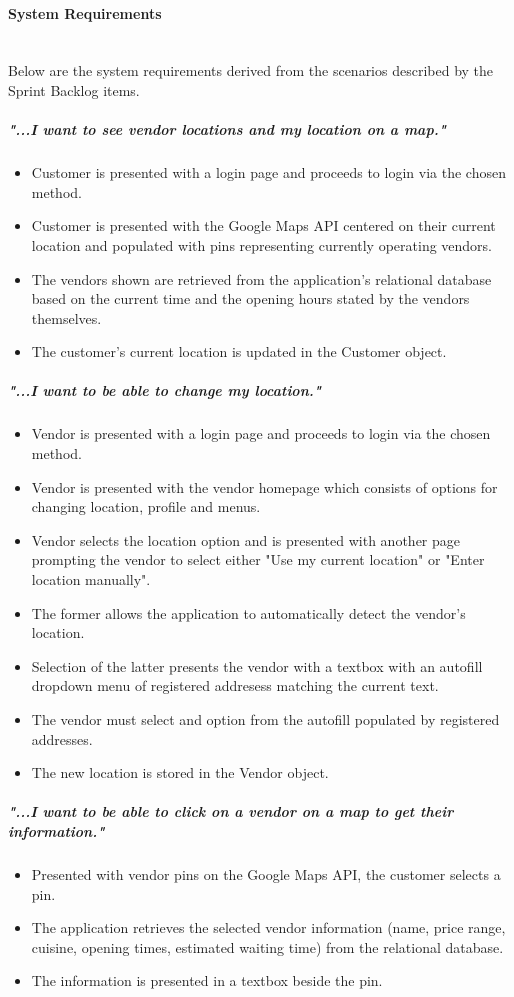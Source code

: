 \paragraph{System Requirements}\mbox{} \\
Below are the system requirements derived from the scenarios described by the Sprint Backlog items.
\subparagraph{"...I want to see vendor locations and my location on a map."}
\begin{itemize}
  \item Customer is presented with a login page and proceeds to login via the chosen method.
  \item Customer is presented with the Google Maps API centered on their current location and populated with pins representing currently operating vendors.
  \item The vendors shown are retrieved from the application's relational database based on the current time and the opening hours stated by the vendors themselves.
  \item The customer's current location is updated in the Customer object.
\end{itemize}
\subparagraph{"...I want to be able to change my location."}
\begin{itemize}
  \item Vendor is presented with a login page and proceeds to login via the chosen method.
  \item Vendor is presented with the vendor homepage which consists of options for changing location, profile and menus.
  \item Vendor selects the location option and is presented with another page prompting the vendor to select either "Use my current location" or "Enter location manually".
  \item The former allows the application to automatically detect the vendor's location.
  \item Selection of the latter presents the vendor with a textbox with an autofill dropdown menu of registered addresess matching the current text.
  \item The vendor must select and option from the autofill populated by registered addresses.
  \item The new location is stored in the Vendor object.
\end{itemize}
\subparagraph{"...I want to be able to click on a vendor on a map to get their information."}
\begin{itemize}
  \item Presented with vendor pins on the Google Maps API, the customer selects a pin.
  \item The application retrieves the selected vendor information (name, price range, cuisine, opening times, estimated waiting time) from the relational database.
  \item The information is presented in a textbox beside the pin.
\end{itemize}


